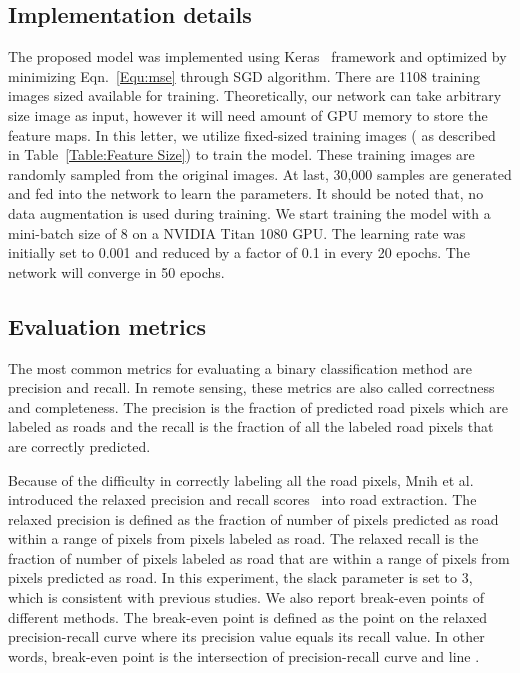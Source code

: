 \documentclass[journal]{IEEEtran}
\begin{document}
\subsection{Implementation details}
The proposed model was implemented using Keras~\cite{chollet2015keras} framework and optimized by minimizing Eqn.~\ref{Equ:mse} through SGD algorithm. There are 1108 training images sized  available for training. Theoretically, our network can take arbitrary size image as input, however it will need amount of GPU memory to store the feature maps. In this letter, we utilize fixed-sized training images ( as described in Table~\ref{Table:Feature Size}) to train the model. These training images are randomly sampled from the original images. At last, 30,000 samples are generated and fed into the network to learn the parameters. It should be noted that, no data augmentation is used during training. We start training the model with a mini-batch size of 8 on a NVIDIA Titan 1080 GPU. The learning rate was initially set to 0.001 and reduced by a factor of 0.1 in every 20 epochs. The network will converge in 50 epochs. 
\subsection{Evaluation metrics}
The most common metrics for evaluating a binary classification method are precision and recall. In remote sensing, these metrics are also called correctness and completeness. The precision is the fraction of predicted road pixels which are labeled as roads and the recall is the fraction of all the labeled road pixels that are correctly predicted.

Because of the difficulty in correctly labeling all the road pixels, Mnih et al.~\cite{mnih2010learning} introduced the relaxed precision and recall scores~\cite{Ehrig2005Relaxed} into road extraction. The relaxed precision is defined as the fraction of number of pixels predicted as road within a range of  pixels from pixels labeled as road. The relaxed recall is the fraction of number of pixels labeled as road that are within a range of  pixels from pixels predicted as road. In this experiment, the slack parameter  is set to 3, which is consistent with previous studies\cite{mnih2010learning,Saito2016Multiple}. We also report break-even points of different methods. The break-even point is defined as the point on the relaxed precision-recall curve where its precision value equals its recall value. In other words, break-even point is the intersection of precision-recall curve and line . 
\end{document}

